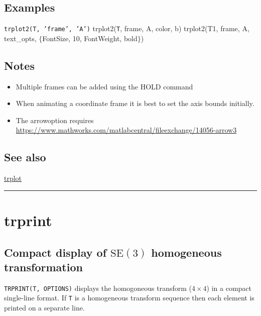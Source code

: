 \subsection*{Examples}


\texttt{trplot2(T, 'frame', 'A')}
trplot2(\texttt{T}, \textquotesingle frame\textquotesingle , \textquotesingle A\textquotesingle , \textquotesingle color\textquotesingle , \textquotesingle b\textquotesingle )
trplot2(T1, \textquotesingle frame\textquotesingle , \textquotesingle A\textquotesingle , \textquotesingle text\_opts\textquotesingle , $\{$\textquotesingle FontSize\textquotesingle , 10, \textquotesingle FontWeight\textquotesingle , \textquotesingle bold\textquotesingle $\}$)


\subsection*{Notes}
\begin{itemize}
  \item Multiple frames can be added using the HOLD command
  \item When animating a coordinate frame it is best to set the axis bounds initially.
  \item The \textquotesingle arrow\textquotesingle  option requires \url{https://www.mathworks.com/matlabcentral/fileexchange/14056-arrow3}
\end{itemize}

\subsection*{See also}


\hyperlink{trplot}{\color{blue} trplot}

\vspace{1.5ex}\rule{\textwidth}{1mm}

\hypertarget{trprint}{\section*{trprint}}
\subsection*{Compact display of $\mbox{SE}(3)$ homogeneous transformation}


\texttt{TRPRINT(T, OPTIONS)} displays the homogoneous transform ($4 \times 4$) in a compact
single-line format.  If \texttt{T} is a homogeneous transform sequence then each
element is printed on a separate line.



